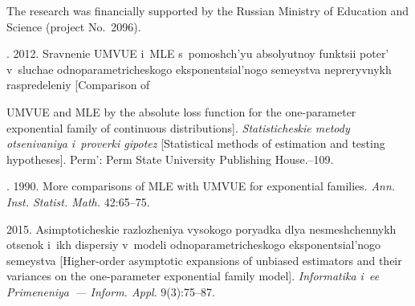 

\Ack
 \noindent
 The research was financially supported by the Russian Ministry of Education
 and Science (project No.~2096).


\vspace*{3pt}

  \begin{multicols}{2}

\renewcommand{\bibname}{\protect\rmfamily References}

{\small\frenchspacing
 {%
 \begin{thebibliography}{9}
 
 \vspace*{-9pt}
 
. 
2012. Sravnenie UMVUE i~MLE s~pomoshch'yu absolyutnoy funktsii po\-ter' v~sluchae 
odnoparametricheskogo eksponentsial'nogo semeystva nepreryvnykh raspredeleniy 
[Comparison of\linebreak\vspace*{-8pt}

\columnbreak

\noindent
 UMVUE and MLE by the absolute loss function for the one-parameter 
exponential family of continuous distributions]. 
\textit{Statisticheskie metody otsenivaniya i~proverki gipotez} 
[Statistical methods of  estimation and testing hypotheses]. 
Perm': Perm State University Publishing House.--109.

\pagebreak


. 1990. More comparisons of MLE with UMVUE 
for exponential families. \textit{Ann. Inst. Statist. Math.} 42:65--75.


 2015. 
Asimptoticheskie razlozheniya vysokogo poryadka dlya nesmeshchennykh otsenok i~ikh 
dispersiy v~modeli odnoparametricheskogo eksponentsial'nogo semeystva 
[Higher-order asymptotic expansions of unbiased estimators and their variances 
on the one-parameter exponential family model]. 
\textit{Informatika i~ee Primeneniya~--- Inform. Appl}. 9(3):75--87.



\end{thebibliography}}}
\end{multicols}
